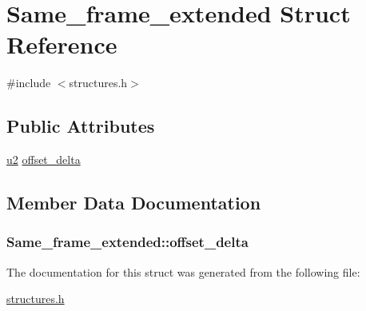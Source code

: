 \hypertarget{structSame__frame__extended}{}\section{Same\+\_\+frame\+\_\+extended Struct Reference}
\label{structSame__frame__extended}


{\ttfamily \#include $<$structures.\+h$>$}

\subsection*{Public Attributes}
\begin{DoxyCompactItemize}
\item 
\hyperlink{structures_8h_a55ef8d87fd202b8417704c089899c5b9}{u2} \hyperlink{structSame__frame__extended_a0305c6ff9d2d1e7b2290435c7de737c7}{offset\+\_\+delta}
\end{DoxyCompactItemize}


\subsection{Member Data Documentation}
\subsubsection[{\texorpdfstring{offset\+\_\+delta}{offset_delta}}]{ Same\+\_\+frame\+\_\+extended\+::offset\+\_\+delta}\hypertarget{structSame__frame__extended_a0305c6ff9d2d1e7b2290435c7de737c7}{}\label{structSame__frame__extended_a0305c6ff9d2d1e7b2290435c7de737c7}


The documentation for this struct was generated from the following file\+:\begin{DoxyCompactItemize}
\item 
\hyperlink{structures_8h}{structures.\+h}\end{DoxyCompactItemize}
